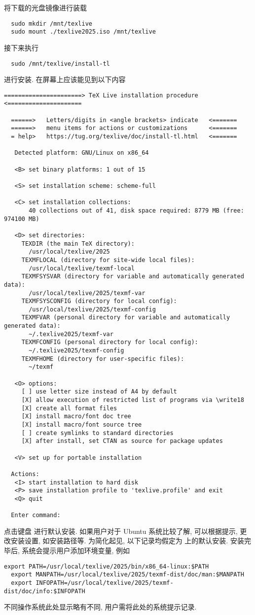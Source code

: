 将下载的光盘镜像进行装载
\begin{lstlisting}
  sudo mkdir /mnt/texlive
  sudo mount ./texlive2025.iso /mnt/texlive
\end{lstlisting}
接下来执行
\begin{lstlisting}
  sudo /mnt/texlive/install-tl
\end{lstlisting}
进行安装.
在屏幕上应该能见到以下内容
\begin{lstlisting}[language = {}, deleteemph = set]
  ======================> TeX Live installation procedure <=====================

  ======>   Letters/digits in <angle brackets> indicate   <=======
  ======>   menu items for actions or customizations      <=======
  = help>   https://tug.org/texlive/doc/install-tl.html   <=======

   Detected platform: GNU/Linux on x86_64

   <B> set binary platforms: 1 out of 15

   <S> set installation scheme: scheme-full

   <C> set installation collections:
       40 collections out of 41, disk space required: 8779 MB (free: 974100 MB)

   <D> set directories:
     TEXDIR (the main TeX directory):
       /usr/local/texlive/2025
     TEXMFLOCAL (directory for site-wide local files):
       /usr/local/texlive/texmf-local
     TEXMFSYSVAR (directory for variable and automatically generated data):
       /usr/local/texlive/2025/texmf-var
     TEXMFSYSCONFIG (directory for local config):
       /usr/local/texlive/2025/texmf-config
     TEXMFVAR (personal directory for variable and automatically generated data):
       ~/.texlive2025/texmf-var
     TEXMFCONFIG (personal directory for local config):
       ~/.texlive2025/texmf-config
     TEXMFHOME (directory for user-specific files):
       ~/texmf

   <O> options:
     [ ] use letter size instead of A4 by default
     [X] allow execution of restricted list of programs via \write18
     [X] create all format files
     [X] install macro/font doc tree
     [X] install macro/font source tree
     [ ] create symlinks to standard directories
     [X] after install, set CTAN as source for package updates

   <V> set up for portable installation

  Actions:
   <I> start installation to hard disk
   <P> save installation profile to 'texlive.profile' and exit
   <Q> quit

  Enter command:
\end{lstlisting}
点击键盘  进行默认安装.
如果用户对于 Ubuntu 系统比较了解,
可以根据提示,
更改安装设置,
如安装路径等.
为简化起见,
以下记录均假定为  上的默认安装.
安装完毕后,
系统会提示用户添加环境变量,
例如
\begin{lstlisting}[deletekeywords = local]
  export PATH=/usr/local/texlive/2025/bin/x86_64-linux:$PATH
  export MANPATH=/usr/local/texlive/2025/texmf-dist/doc/man:$MANPATH
  export INFOPATH=/usr/local/texlive/2025/texmf-dist/doc/info:$INFOPATH
\end{lstlisting}
不同操作系统此处显示略有不同,
用户需将此处的系统提示记录.

